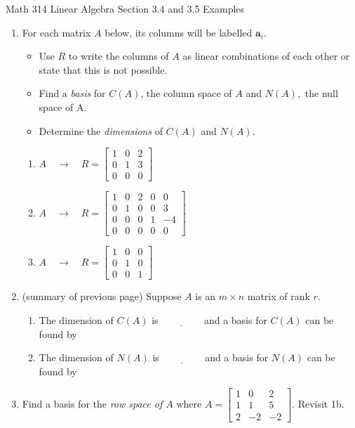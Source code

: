 \documentclass[12pt]{amsart}
\begin{document}
\scriptsize \noindent Math 314 Linear Algebra \hfill Section 3.4 and 3.5 Examples 
\normalsize\medskip


\thispagestyle{empty}
\begin{enumerate}
\item For each matrix $A$ below, its columns will be labelled $\mathbf{a}_i$.\\
	\begin{itemize}
	\item Use $R$ to write the columns of $A$ as linear combinations of each other or state that this is not possible.
	\item Find a \emph{basis} for $C(A)$, the column space of $A$ and  $N(A),$ the null space of A. 
	\item Determine the \emph{dimensions} of $C(A)$ and  $N(A)$.
	\end{itemize}
	\begin{enumerate}
	\item $A \quad \to \quad R = \begin{bmatrix} 1 & 0 & 2 \\ 0 & 1 & 3 \\ 0 & 0 & 0 \end{bmatrix}$
	\vfill
	\item $A \quad \to \quad R = \begin{bmatrix} 1 & 0 & 2 &0&0\\ 0 & 1 & 0&0&3 \\ 0 & 0 & 0&1&-4 \\0&0&0&0&0\end{bmatrix}$
	\vfill
	\item $A \quad \to \quad R = \begin{bmatrix} 1 & 0 & 0 \\ 0 & 1 & 0 \\ 0 & 0 & 1 \end{bmatrix}$
	\vspace{.5in}
	\end{enumerate}
\newpage
\item (summary of previous page) Suppose $A$ is an $m \times n$ matrix of rank $r$.\\
	\begin{enumerate}
	\item The dimension of $C(A)$ is $\underline{\qquad\qquad}$ and a basis for $C(A)$ can be found by\\
	\medskip
	\medskip
	\item The dimension of $N(A)$ is $\underline{\qquad\qquad}$ and a basis for $N(A)$ can be found by\\
	\medskip
	\medskip
	\end{enumerate}
\item Find a basis for the \emph{row space of $A$} where $A = \begin{bmatrix} 1 & 0 & 2 \\ 1 & 1 & 5 \\ 2 & -2 & -2 \end{bmatrix}.$
\vfill
Revisit 1b.
\end{enumerate}
\end{document}
